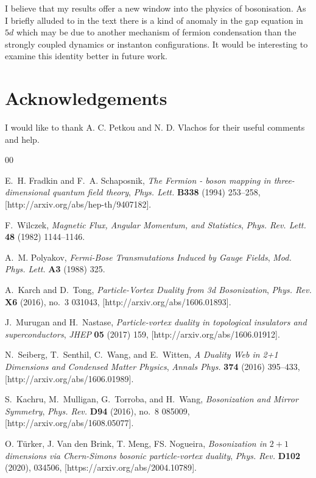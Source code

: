 \documentclass[twoside]{article}
\begin{document}
I believe that my results offer a new window into the physics of bosonisation. As I briefly alluded to in the text there is a kind of anomaly in the gap equation in $5d$ which may be due to another mechanism of fermion condensation than the strongly coupled dynamics or instanton configurations. It would be interesting to examine this identity better in future work.

\section*{Acknowledgements}
I would like to thank A. C. Petkou and N. D. Vlachos for their useful comments and help. 

\begin{thebibliography}{00}
  
E.~H. Fradkin and F.~A. Schaposnik, {\it {The Fermion - boson mapping in
  three-dimensional quantum field theory}}, {\em Phys. Lett.} {\bf B338}
  (1994) 253--258, [{http://arxiv.org/abs/hep-th/9407182}].

F.~Wilczek, {\it {Magnetic Flux, Angular Momentum, and Statistics}}, {\em
  Phys. Rev. Lett.} {\bf 48} (1982) 1144--1146.

A.~M. Polyakov, {\it {Fermi-Bose Transmutations Induced by Gauge Fields}},
  {\em Mod. Phys. Lett.} {\bf A3} (1988) 325.

A.~Karch and D.~Tong, {\it {Particle-Vortex Duality from 3d Bosonization}},
  {\em Phys. Rev.} {\bf X6} (2016), no.~3 031043,
  [{http://arxiv.org/abs/1606.01893}].

J.~Murugan and H.~Nastase, {\it {Particle-vortex duality in topological
  insulators and superconductors}}, {\em JHEP} {\bf 05} (2017) 159,
  [{http://arxiv.org/abs/1606.01912}].

N.~Seiberg, T.~Senthil, C.~Wang, and E.~Witten, {\it {A Duality Web in 2+1
  Dimensions and Condensed Matter Physics}}, {\em Annals Phys.} {\bf 374}
  (2016) 395--433, [{http://arxiv.org/abs/1606.01989}].

S.~Kachru, M.~Mulligan, G.~Torroba, and H.~Wang, {\it {Bosonization and Mirror
  Symmetry}}, {\em Phys. Rev.} {\bf D94} (2016), no.~8 085009,
  [{http://arxiv.org/abs/1608.05077}].

O. Türker, J. Van den Brink, T. Meng, FS. Nogueira, {\it {Bosonization in $2+1$ dimensions via 
Chern-Simons bosonic particle-vortex duality}}, {\em Phys. Rev.} {\bf D102} (2020), 034506,
[{https://arxiv.org/abs/2004.10789}].



\end{thebibliography}
\end{document}
